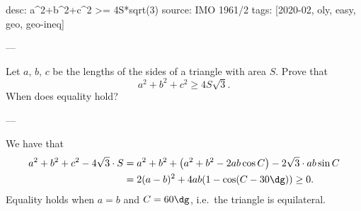 desc: a^2+b^2+c^2 >= 4S*sqrt(3)
source: IMO 1961/2
tags: [2020-02, oly, easy, geo, geo-ineq]

---

Let $a$, $b$, $c$ be the lengths of the sides of a triangle with area $S$. Prove that \[a^2+b^2+c^2\ge4S\sqrt3.\]
When does equality hold?

---

We have that
\begin{align*}
    a^2+b^2+c^2-4\sqrt3\cdot S&=a^2+b^2+\left(a^2+b^2-2ab\cos C\right)-2\sqrt3\cdot ab\sin C\\
    &=2(a-b)^2+4ab(1-\cos(C-30\dg))\ge0.
\end{align*}
Equality holds when $a=b$ and $C=60\dg$, i.e.\ the triangle is equilateral.
